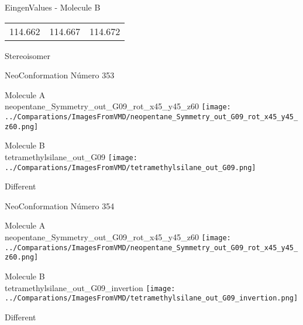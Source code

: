 \begin{multicols}{2}
\begin{center}
\vtab
 EingenValues - Molecule B     \\
\vtab
\begin{tabular}{|c c c|}
114.662	 & 	114.667	 & 	114.672	 \\
\end{tabular}

\end{center}
\end{multicols}
\begin{center}
\vtab
\vtab
\textcolor{NavyBlue}{\Large Stereoisomer}
\end{center}

 \newpage

\vtab[-2cm]
\begin{center}
{\large NeoConformation \tab Número 353}
\end{center}
\begin{multicols}{2}
\begin{center}
Molecule A \\ 
neopentane\_Symmetry\_out\_G09\_rot\_x45\_y45\_z60
\texttt{[image: ../Comparations/ImagesFromVMD/neopentane\_Symmetry\_out\_G09\_rot\_x45\_y45\_z60.png]}
\\
\vtab

\columnbreak
Molecule B \\ 
tetramethylsilane\_out\_G09
\texttt{[image: ../Comparations/ImagesFromVMD/tetramethylsilane\_out\_G09.png]}
\\
\vtab


\end{center}
\end{multicols}
\begin{center}
\vtab
\vtab
\textcolor{NavyBlue}{\Large Different}
\end{center}

 \newpage

\vtab[-2cm]
\begin{center}
{\large NeoConformation \tab Número 354}
\end{center}
\begin{multicols}{2}
\begin{center}
Molecule A \\ 
neopentane\_Symmetry\_out\_G09\_rot\_x45\_y45\_z60
\texttt{[image: ../Comparations/ImagesFromVMD/neopentane\_Symmetry\_out\_G09\_rot\_x45\_y45\_z60.png]}
\\
\vtab

\columnbreak
Molecule B \\ 
tetramethylsilane\_out\_G09\_invertion
\texttt{[image: ../Comparations/ImagesFromVMD/tetramethylsilane\_out\_G09\_invertion.png]}
\\
\vtab


\end{center}
\end{multicols}
\begin{center}
\vtab
\vtab
\textcolor{NavyBlue}{\Large Different}
\end{center}

